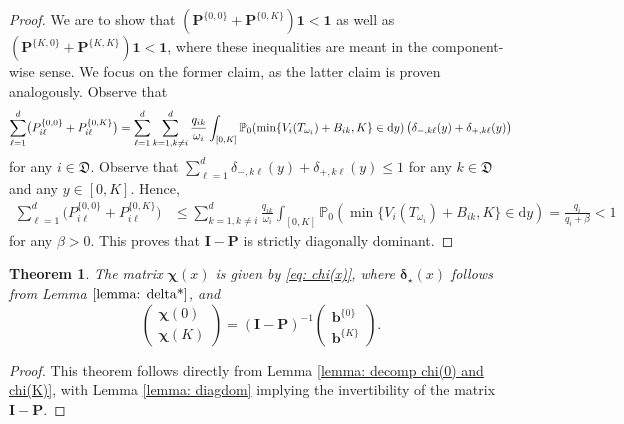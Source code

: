 \documentclass[reqno,12pt]{amsart}
\newcommand{\bs}{\boldsymbol}
\newcommand{\defD}{{\mathfrak D}}
\newtheorem{theorem}{Theorem}
\begin{document}
\begin{proof}
    We are to show that $(\bs{P}^{\{0,0\}}+\bs{P}^{\{0,K\}}){\bs 1}< {\bs 1}$ as well as $(\bs{P}^{\{K,0\}}+\bs{P}^{\{K,K\}}){\bs 1}< {\bs 1}$, where these inequalities are meant in the component-wise sense. We focus on the former claim, as the latter claim is proven analogously. Observe that
     \begin{align*}
        \sum_{\ell=1}^d \bigl(P^{\{0,0\}}_{i\ell}+P^{\{0,K\}}_{i\ell}\bigr)
        = \sum_{\ell=1}^d \sum_{k=1,k\neq i}^d \frac{q_{ik}}{\omega_i}
        \int_{[0,K]} \mathbb{P}_0\!\left(\min\{V_i(T_{\omega_i})+B_{ik},K\}\in{\rm  d}y\right)
        \bigl(\delta_{-,k\ell}(y)+\delta_{+,k\ell}(y)\bigr)
    \end{align*}
     for any $i\in\defD $.
    Observe that $\sum_{\ell=1}^d \delta_{-,k\ell}(y) + \delta_{+,k\ell}(y)\leqslant 1$ for any $k\in\defD$ and any $y\in[0,K]$. Hence,
    \begin{align*}
         \sum_{\ell=1}^d \bigl(P^{\{0,0\}}_{i\ell}+P^{\{0,K\}}_{i\ell} \bigr)&\leqslant  \sum_{k=1,k\neq i}^d \frac{q_{ik}}{\omega_i}\int_{[0,K]}\mathbb{P}_0\left(\min\{V_i(T_{\omega_i}) + B_{ik}, K\}\in\mathrm{d}y\right)=\frac{q_i}{q_i + \beta} < 1
     \end{align*}
    for any $\beta>0$.
    This proves that $\bs{I}-\bs{P}$ is strictly diagonally dominant. 
\end{proof}
\begin{theorem}\label{thrm: general chi(x)}
    The matrix $\bs\chi(x)$ is given by \eqref{eq: chi(x)}, where $\bs\delta_\star(x)$ follows from Lemma $\ref{lemma: delta*}$, and  \begin{equation*}
        \left(\begin{array}{c} {\bs \chi}(0) \\ {\bs \chi}(K)\end{array} \right)=( {\bs I}-{\bs P})^{-1} \left(\begin{array}{c} {\bs b}^{\{0\}} \\ {\bs b}^{\{K\}}\end{array} \right).
    \end{equation*}
\end{theorem}
 
\begin{proof}
    This theorem follows directly from Lemma \ref{lemma: decomp chi(0) and chi(K)}, with Lemma \ref{lemma: diagdom} implying the invertibility of the matrix ${\bs I}-{\bs P}$.
\end{proof}
\end{document}
